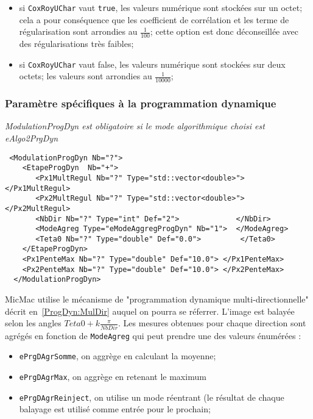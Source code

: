 \begin{itemize}
   \item si {\tt CoxRoyUChar} vaut {\tt true}, les valeurs num\'erique sont
         stock\'ees sur un octet; cela a pour cons\'equence que
         les coefficient de corr\'elation et les terme de r\'egularisation
         sont arrondies au $\frac{1}{100}$; cette option est donc
         d\'econseill\'ee avec des r\'egularisations  tr\`es faibles;

   \item si {\tt CoxRoyUChar} vaut false, les valeurs num\'erique sont
         stock\'ees sur deux octets; les valeurs
         sont arrondies au $\frac{1}{10000}$;
\end{itemize}

\subsubsection{Param\`etre sp\'ecifiques \`a la programmation dynamique}

\emph{ModulationProgDyn est obligatoire si le mode
 algorithmique choisi est eAlgo2PrgDyn}

\begin{verbatim}
 <ModulationProgDyn Nb="?">
    <EtapeProgDyn  Nb="+">
       <Px1MultRegul Nb="?" Type="std::vector<double>"> </Px1MultRegul>
       <Px2MultRegul Nb="?" Type="std::vector<double>"> </Px2MultRegul>
       <NbDir Nb="?" Type="int" Def="2">             </NbDir>
       <ModeAgreg Type="eModeAggregProgDyn" Nb="1">  </ModeAgreg>
       <Teta0 Nb="?" Type="double" Def="0.0">         </Teta0>
    </EtapeProgDyn>
    <Px1PenteMax Nb="?" Type="double" Def="10.0"> </Px1PenteMax>
    <Px2PenteMax Nb="?" Type="double" Def="10.0"> </Px2PenteMax>
  </ModulationProgDyn>
\end{verbatim}

MicMac utilise le m\'ecanisme de
"programmation dynamique multi-directionnelle"
d\'ecrit en~\ref{ProgDyn:MulDir} auquel on pourra se r\'eferrer.
L'image est balay\'ee selon les
angles $Teta0 + k \frac{\pi}{NbDir}$. Les mesures obtenues pour
chaque direction sont
agr\'eg\'es en fonction de {\tt ModeAgreg} qui peut prendre
une des valeurs \'enum\'er\'ees :

\begin{itemize}
      \item {\tt ePrgDAgrSomme}, on aggr\`ege en calculant la  moyenne;
      \item {\tt ePrgDAgrMax},    on aggr\`ege en retenant le maximum
      \item {\tt ePrgDAgrReinject}, on utilise un mode r\'eentrant (le r\'esultat
            de chaque balayage est utilis\'e comme entr\'ee pour le prochain;
\end{itemize}

